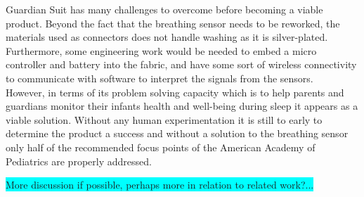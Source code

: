 \documentclass{sigchi-ext}
\begin{document}
Guardian Suit has many challenges to overcome before becoming a viable product. Beyond the fact that the breathing sensor needs
to be reworked, the materials used as connectors does not handle washing as it is silver-plated. Furthermore, some engineering
work would be needed to embed a micro controller and battery into the fabric, and have some sort of wireless connectivity to communicate with software to interpret the signals from the sensors. \\
However, in terms of its problem solving capacity which is to help parents and guardians monitor their infants health and well-being
during sleep it appears as a viable solution. Without any human experimentation it is still to early to determine the product a 
success and without a solution to the breathing sensor only half of the recommended focus points of the American Academy of Pediatrics
are properly addressed.

\colorbox{cyan}{More discussion if possible, perhaps more in relation to related work?...}









\balance{}



\end{document}
